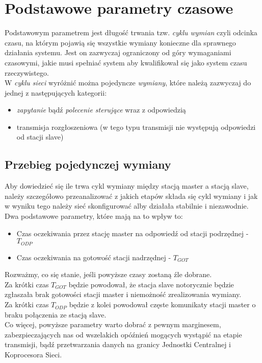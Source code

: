 \section{Podstawowe parametry czasowe}
Podstawowym parametrem jest długość trwania tzw. \textit{cyklu wymian} czyli odcinka czasu, na którym pojawią się wszystkie wymiany konieczne dla sprawnego działania systemu. Jest on zazwyczaj ograniczony od góry wymaganiami czasowymi, jakie musi spełniać system aby kwalifikował się jako system czasu rzeczywistego.\\
W \textit{cyklu sieci} wyróżnić można pojedyncze \textit{wymiany}, które należą zazwyczaj do jednej z następujących kategorii:
\begin{itemize}
	\item \textit{zapytanie} bądź \textit{polecenie sterujące} wraz z odpowiedzią
	\item transmisja rozgłoszeniowa (w tego typu transmisji nie występują odpowiedzi od stacji slave)
\end{itemize}

	\subsection{Przebieg pojedynczej wymiany}
	Aby dowiedzieć się ile trwa cykl wymiany między stacją master a stacją slave, należy szczegółowo przeanalizować z jakich etapów składa się cykl wymiany i jak w wyniku tego należy sieć skonfigurować alby działała stabilnie i niezawodnie. Dwa podstawowe parametry, które mają na to wpływ to:
	\begin{itemize}
		\item Czas oczekiwania przez stację master na odpowiedź od stacji podrzędnej - $ T_{ODP} $
		\item Czas oczekiwania na gotowość stacji nadrzędnej -  $ T_{GOT} $
	\end{itemize}
	Rozważmy, co się stanie, jeśli powyższe czasy zostaną źle dobrane. \\ Za krótki czas $ T_{GOT} $ będzie powodował, że stacja slave notorycznie będzie zgłaszała brak gotowości stacji master i niemożność zrealizowania wymiany. \\
	Za krótki czas $ T_{ODP} $ będzie z kolei powodował częste komunikaty stacji master o braku połączenia ze stacją slave. \\
	Co więcej, powyższe parametry warto dobrać z pewnym marginesem, zabezpieczających nas od wszelakich opóźnień mogących wystąpić na etapie transmisji, bądź przetwarzania danych na granicy Jednostki Centralnej i Koprocesora Sieci.